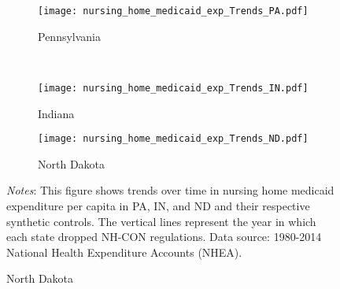 \documentclass[../Main.tex]{subfiles}
\begin{document}
\newpage
\begin{figure}[t]
	\begin{center}
	\caption{\label{fig:medicaid_exp_trends} \centering Trends in Nursing Home Medicaid Expenditure Per Capita}
    \begin{subfigure}[b]{\textwidth} \centering
    \caption{Pennsylvania}\texttt{[image: nursing\_home\_medicaid\_exp\_Trends\_PA.pdf]}
    \end{subfigure}\\
    \vspace{.4cm}
    \begin{subfigure}[b]{.48\textwidth} \centering
    \caption{Indiana}\texttt{[image: nursing\_home\_medicaid\_exp\_Trends\_IN.pdf]}
    \end{subfigure}\quad%
    \begin{subfigure}[b]{.48\textwidth} \centering
    \caption{North Dakota}\texttt{[image: nursing\_home\_medicaid\_exp\_Trends\_ND.pdf]}
    \end{subfigure}
    \end{center}
    \footnotesize
		\textit{Notes}: This figure shows trends over time in nursing home medicaid expenditure per capita in PA, IN, and ND and their respective synthetic controls. The vertical lines represent the year in which each state dropped NH-CON regulations. Data source: 1980-2014 National Health Expenditure Accounts (NHEA).
\end{figure}
\clearpage
\end{document}
